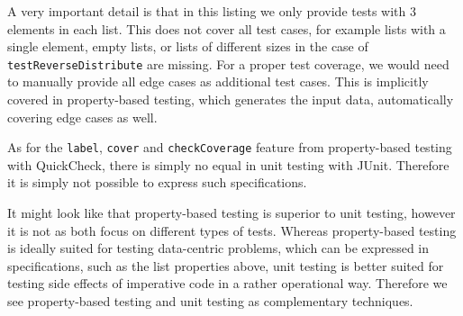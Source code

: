 A very important detail is that in this listing we only provide tests with 3 elements in each list. This does not cover all test cases, for example lists with a single element, empty lists, or lists of different sizes in the case of \texttt{testReverseDistribute} are missing. For a proper test coverage, we would need to manually provide all edge cases as additional test cases. This is implicitly covered in property-based testing, which generates the input data, automatically covering edge cases as well.

As for the \texttt{label}, \texttt{cover} and \texttt{checkCoverage} feature from property-based testing with QuickCheck, there is simply no equal in unit testing with JUnit. Therefore it is simply not possible to express such specifications.

It might look like that property-based testing is superior to unit testing, however it is not as both focus on different types of tests. Whereas property-based testing is ideally suited for testing data-centric problems, which can be expressed in specifications, such as the list properties above, unit testing is better suited for testing side effects of imperative code in a rather operational way. Therefore we see property-based testing and unit testing as complementary techniques.